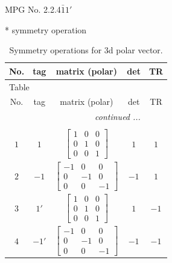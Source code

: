\documentclass[fleqn,8pt]{jsarticle}
\begin{document}
\setcounter{MaxMatrixCols}{32}

\renewcommand{\tablename}{Table~}
\renewcommand{\figurename}{Figure~}
\begin{center}
\LARGE
MPG No. 2.2.4\quad$\bar{1}1'$
\end{center}
* symmetry operation
\renewcommand{\arraystretch}{1.3}
\begin{longtable}{ccccc}
\caption{Symmetry operations for 3d polar vector.}
 \\
 \hline \hline
No. & tag & matrix (polar) & det & TR \\ \hline \endfirsthead

\multicolumn{4}{l}{\tablename\ \thetable{}} \\
 \hline \hline
No. & tag & matrix (polar) & det & TR \\ \hline \endhead

 \hline \hline
\multicolumn{4}{r}{\footnotesize\it continued ...} \\ \endfoot

 \hline \hline
\multicolumn{4}{r}{} \\ \endlastfoot

$ 1 $ & $ 1 $ & $ \begin{bmatrix} 1 & 0 & 0 \\ 0 & 1 & 0 \\ 0 & 0 & 1 \end{bmatrix} $ & $ 1 $ & $ 1 $ \\ \hline
$ 2 $ & $ -1 $ & $ \begin{bmatrix} -1 & 0 & 0 \\ 0 & -1 & 0 \\ 0 & 0 & -1 \end{bmatrix} $ & $ -1 $ & $ 1 $ \\ \hline
$ 3 $ & $ 1{}' $ & $ \begin{bmatrix} 1 & 0 & 0 \\ 0 & 1 & 0 \\ 0 & 0 & 1 \end{bmatrix} $ & $ 1 $ & $ -1 $ \\ \hline
$ 4 $ & $ -1{}' $ & $ \begin{bmatrix} -1 & 0 & 0 \\ 0 & -1 & 0 \\ 0 & 0 & -1 \end{bmatrix} $ & $ -1 $ & $ -1 $ \\
\end{longtable}
\end{document}

